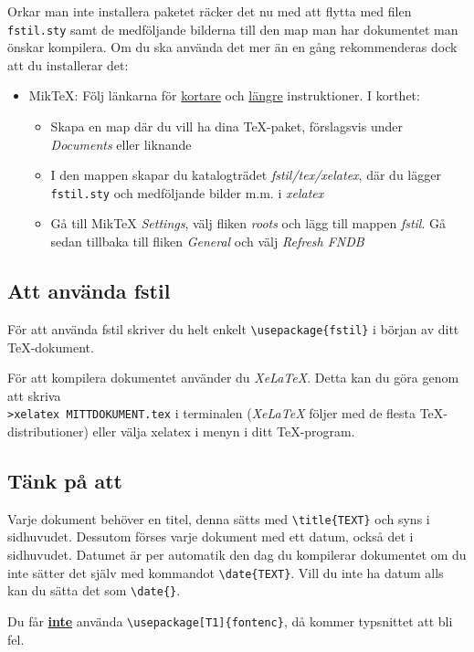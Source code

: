 \documentclass[a4paper]{article}
\newcommand{\bs}{\textbackslash}
\begin{document}
Orkar man inte installera paketet räcker det nu med att flytta med filen \texttt{fstil.sty} samt de medföljande bilderna till den map man har dokumentet man önskar kompilera. Om du ska använda det mer än en gång rekommenderas dock att du installerar det:
\begin{itemize}
\item[] MikTeX: Följ länkarna för \href{http://docs.miktex.org/faq/maintenance.html#styfiles}{kortare} och \href{http://docs.miktex.org/manual/localadditions.html}{längre} instruktioner. I korthet: \begin{itemize}
\item Skapa en map där du vill ha dina \TeX-paket, förslagsvis under \textit{Documents} eller liknande
\item I den mappen skapar du katalogträdet \textit{fstil/tex/xelatex}, där du lägger \texttt{fstil.sty} och medföljande bilder m.m. i \textit{xelatex}
\item Gå till MikTeX \textit{Settings}, välj fliken \textit{roots} och lägg till mappen \textit{fstil}. Gå sedan tillbaka till fliken \textit{General} och välj \textit{Refresh FNDB}
\end{itemize}
\end{itemize}

\subsection{Att använda fstil}
För att använda fstil skriver du helt enkelt \texttt{\bs usepackage\{fstil\}} i början av ditt \TeX-dokument.

För att kompilera dokumentet använder du \textit{XeLaTeX}. Detta kan du göra genom att skriva \\ \texttt{>xelatex MITTDOKUMENT.tex} i terminalen (\textit{XeLaTeX} följer med de flesta \TeX-distributioner) eller välja xelatex i menyn i ditt \TeX-program.

\subsection{Tänk på att}
Varje dokument behöver en titel, denna sätts med \texttt{\bs title\{TEXT\}} och syns i sidhuvudet. Dessutom förses varje dokument med ett datum, också det i sidhuvudet. Datumet är per automatik den dag du kompilerar dokumentet om du inte sätter det själv med kommandot \texttt{\bs date\{TEXT\}}. Vill du inte ha datum alls kan du sätta det som \texttt{\bs date\{\}}.

Du får \textbf{\underline{inte}} använda \texttt{\bs usepackage[T1]\{fontenc\}}, då kommer typsnittet att bli fel.
\end{document}
